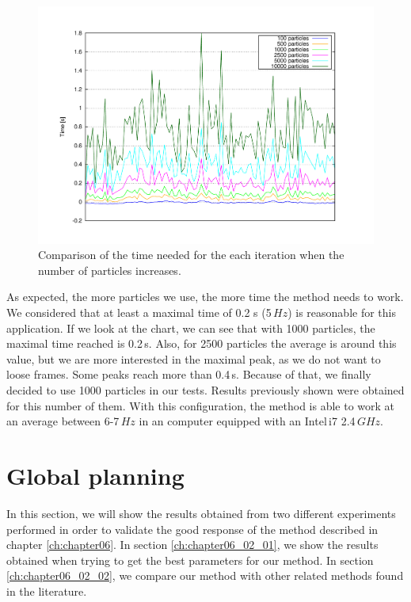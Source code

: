 \begin{figure}[t]
  \centering
  \includegraphics[width=\textwidth,height=0.5\textwidth,trim=50 50 90 60, clip]{timesVsParticles}
  \caption{Comparison of the time needed for the each iteration when the number of particles increases.}\label{fig:cp05_time_vs_particles}
\end{figure}

As expected, the more particles we use, the more time the method needs to work. We considered that at least a maximal time of 0.2 s (5\,$Hz$) is reasonable for this application. If we look at the chart, we can see that with 1000 particles, the maximal time reached is 0.2\,s. Also, for 2500 particles the average is around this value, but we are more interested in the maximal peak, as we do not want to loose frames. Some peaks reach more than 0.4\,s. Because of that, we finally decided to use 1000 particles in our tests. Results previously shown were obtained for this number of them. With this configuration, the method is able to work at an average between 6-7\,$Hz$ in an computer equipped with an Intel\textregistered\,i7 2.4\,$GHz$.
 
\FloatBarrier
 
\graphicspath{{./images/chapter06/bmps/}{./images/chapter06/vects/}{./images/chapter06/}}
\section{Global planning}\label{ch:chapter06_02}

In this section, we will show the results obtained from two different experiments performed in order to validate the good response of the method described in chapter \ref{ch:chapter06}. In section \ref{ch:chapter06_02_01}, we show the results obtained when trying to get the best parameters for our method. In section \ref{ch:chapter06_02_02}, we compare our method with other related methods found in the literature.

